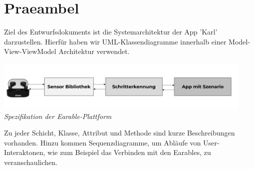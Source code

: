 \documentclass[../entwurf.tex]{subfiles}
\begin{document}
\maketitle
\tableofcontents

\clearpage
\section{Praeambel}
Ziel des Entwurfsdokuments ist die Systemarchitektur der App 'Karl' darzustellen. Hierfür haben wir UML-Klassendiagramme innerhalb einer Model-View-ViewModel Architektur verwendet.

	\begin{center}
		\includegraphics[page=1,width=350pt,keepaspectratio]{../graphics/Praeambel/YHB_Project_Pic.png}
		\textit{Spezifikation der Earable-Plattform }
	\end{center}

Zu jeder Schicht, Klasse, Attribut und Methode sind kurze Beschreibungen vorhanden. Hinzu kommen Sequenzdiagramme, um Abläufe von User-Interaktonen, wie zum Beispiel das Verbinden mit den Earables, zu veranschaulichen.
\end{document}
